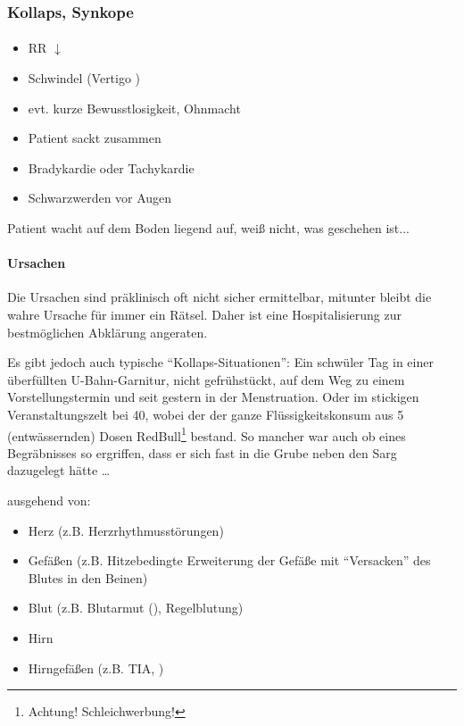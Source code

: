 \subsubsection{Kollaps, Synkope}


\paragraph{\TxSymptome}

\begin{itemize}
  \item RR ${\downarrow}$
  \item Schwindel (Vertigo )
  \item evt. kurze Bewusstlosigkeit, Ohnmacht
  \item Patient sackt zusammen
  \item Bradykardie oder Tachykardie
  \item Schwarzwerden vor Augen
\end{itemize}

Patient wacht auf dem Boden liegend  auf, weiß nicht, was geschehen
ist...

\paragraph{Ursachen} Die Ursachen sind präklinisch oft
nicht sicher ermittelbar, mitunter bleibt die wahre Ursache
für immer ein Rätsel. Daher ist eine Hospitalisierung zur
bestmöglichen Abklärung angeraten. 

Es gibt jedoch auch typische "`Kollaps-Situationen"': Ein
schwüler Tag in einer überfüllten U-Bahn-Garnitur, nicht
gefrühstückt, auf dem Weg zu einem Vorstellungstermin und
seit gestern in der Menstruation. Oder im stickigen
Veranstaltungszelt bei 40\textdegree , wobei der der ganze
Flüssigkeitskonsum aus 5 (entwässernden) Dosen
RedBull\texttrademark\footnote{Achtung! Schleichwerbung!}
bestand. So mancher war auch ob eines Begräbnisses so
ergriffen, dass er sich fast in die Grube neben den Sarg
dazugelegt hätte \ldots 

ausgehend von:

\begin{itemize}
  \item Herz (z.B. Herzrhythmusstörungen)
  \item Gefäßen (z.B. Hitzebedingte Erweiterung
  der Gefäße mit "`Versacken"' des Blutes in den Beinen)
  \item Blut (z.B. Blutarmut (),
  Regelblutung)
  \item Hirn
  \item Hirngefäßen (z.B. TIA,
   )
\end{itemize}


